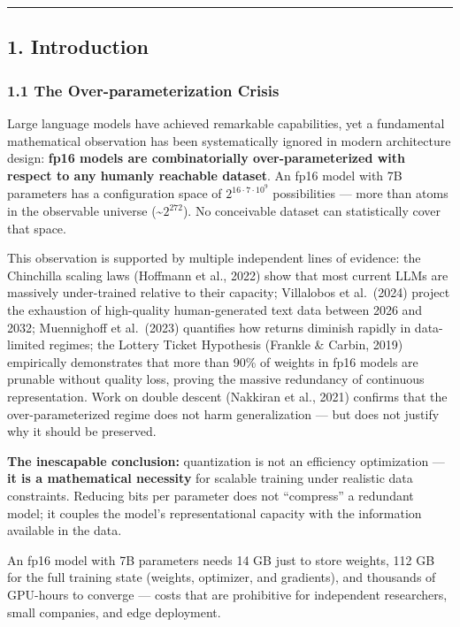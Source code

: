 \begin{center}\rule{0.5\linewidth}{0.5pt}\end{center}

\subsection{1. Introduction}\label{introduction}

\subsubsection{1.1 The Over-parameterization
Crisis}\label{the-over-parameterization-crisis}

Large language models have achieved remarkable capabilities, yet a
fundamental mathematical observation has been systematically ignored in
modern architecture design: \textbf{fp16 models are combinatorially
over-parameterized with respect to any humanly reachable dataset}. An
fp16 model with 7B parameters has a configuration space of
\(2^{16 \cdot 7 \cdot 10^9}\) possibilities --- more than atoms in the
observable universe (\textasciitilde{}\(2^{272}\)). No conceivable
dataset can statistically cover that space.

This observation is supported by multiple independent lines of evidence:
the Chinchilla scaling laws (Hoffmann et al., 2022) show that most
current LLMs are massively under-trained relative to their capacity;
Villalobos et al.~(2024) project the exhaustion of high-quality
human-generated text data between 2026 and 2032; Muennighoff et
al.~(2023) quantifies how returns diminish rapidly in data-limited
regimes; the Lottery Ticket Hypothesis (Frankle \& Carbin, 2019)
empirically demonstrates that more than 90\% of weights in fp16 models
are prunable without quality loss, proving the massive redundancy of
continuous representation. Work on double descent (Nakkiran et al.,
2021) confirms that the over-parameterized regime does not harm
generalization --- but does not justify why it should be preserved.

\textbf{The inescapable conclusion:} quantization is not an efficiency
optimization --- \textbf{it is a mathematical necessity} for scalable
training under realistic data constraints. Reducing bits per parameter
does not ``compress'' a redundant model; it couples the model's
representational capacity with the information available in the data.

An fp16 model with 7B parameters needs 14 GB just to store weights, 112
GB for the full training state (weights, optimizer, and gradients), and
thousands of GPU-hours to converge --- costs that are prohibitive for
independent researchers, small companies, and edge deployment.

